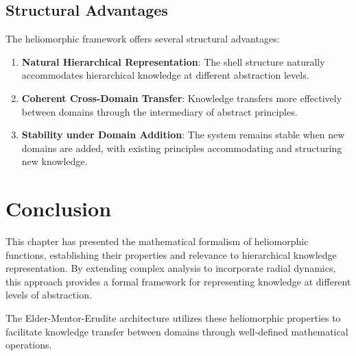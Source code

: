 \subsection{Structural Advantages}

The heliomorphic framework offers several structural advantages:

\begin{enumerate}
    \item \textbf{Natural Hierarchical Representation}: The shell structure naturally accommodates hierarchical knowledge at different abstraction levels.
    
    \item \textbf{Coherent Cross-Domain Transfer}: Knowledge transfers more effectively between domains through the intermediary of abstract principles.
    
    \item \textbf{Stability under Domain Addition}: The system remains stable when new domains are added, with existing principles accommodating and structuring new knowledge.
\end{enumerate}

\section{Conclusion}

This chapter has presented the mathematical formalism of heliomorphic functions, establishing their properties and relevance to hierarchical knowledge representation. By extending complex analysis to incorporate radial dynamics, this approach provides a formal framework for representing knowledge at different levels of abstraction.

The Elder-Mentor-Erudite architecture utilizes these heliomorphic properties to facilitate knowledge transfer between domains through well-defined mathematical operations.